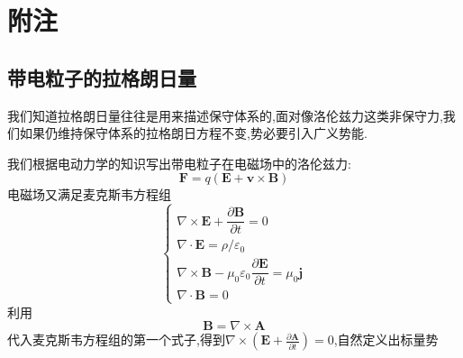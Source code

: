 

\chapter{附注}
\section{带电粒子的拉格朗日量}
我们知道拉格朗日量往往是用来描述保守体系的,面对像洛伦兹力这类非保守力,我们如果仍维持保守体系的拉格朗日方程不变,势必要引入广义势能.

我们根据电动力学的知识写出带电粒子在电磁场中的洛伦兹力:
\begin{equation}
    \boldsymbol F=q(\boldsymbol E+\boldsymbol v\times \boldsymbol  B)
\end{equation}
电磁场又满足麦克斯韦方程组
\begin{equation}
    \left\{\begin{array}{l}\nabla \times \boldsymbol{E}+\dfrac{\partial \boldsymbol{B}}{\partial t}=0 \\ \nabla \cdot \boldsymbol{E}=\rho / \varepsilon_{0} \\ \nabla \times \boldsymbol{B}-\mu_{0} \varepsilon_{0} \dfrac{\partial \boldsymbol{E}}{\partial t}=\mu_{0} \boldsymbol{j} \\ \nabla \cdot \boldsymbol{B}=0\end{array}\right.
\end{equation}
利用
\begin{equation}
    \boldsymbol{B}=\nabla \times \boldsymbol{A}
\end{equation}
代入麦克斯韦方程组的第一个式子,得到$\nabla \times\left(\boldsymbol{E}+\frac{\partial \boldsymbol{A}}{\partial t}\right)=0$,自然定义出标量势

